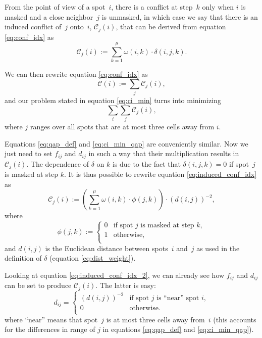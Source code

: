 \documentclass{bioinfo}
\begin{document}
From the point of view of a spot~$i$, there is a conflict at step~$k$ only when $i$ is masked and a close neighbor~$j$ is unmasked, in which case we say that there is an induced conflict of~$j$ onto~$i$, $\mathcal{C}_{j}(i)$, that can be derived from equation \ref{eq:conf_idx} as
\begin{equation}
\label{eq:induced_conf_idx}
\mathcal{C}_{j}(i) := \sum_{k=1}^{\mu} \omega(i,k) \cdot \delta(i,j,k).
\end{equation}

We can then rewrite equation \ref{eq:conf_idx} as
\begin{equation}
\mathcal{C}(i) := \sum_{j} \mathcal{C}_{j}(i),
\end{equation}
and our problem stated in equation \ref{eq:ci_min} turns into minimizing
\begin{equation}
\label{eq:ci_min_qap}
\sum_{i} \sum_{j} \mathcal{C}_{j}(i),
\end{equation}
where $j$ ranges over all spots that are at most three cells away from $i$.

Equations \ref{eq:qap_def} and \ref{eq:ci_min_qap} are conveniently similar. Now we just need to set $f_{ij}$ and $d_{ij}$ in such a way that their multiplication results in $\mathcal{C}_{j}(i)$. The dependence of $\delta$ on $k$ is due to the fact that $\delta(i,j,k) = 0$ if spot~$j$ is masked at step $k$. It is thus possible to rewrite equation \ref{eq:induced_conf_idx} as
\begin{equation}
\label{eq:induced_conf_idx_2}
\mathcal{C}_{j}(i) := \left( \sum_{k=1}^{\mu} \omega(i,k) \cdot \phi(j,k) \right) \cdot (d(i,j))^{-2},
\end{equation}
where
\begin{equation}
\phi(j,k) :=
        \left\{
                \begin{array}{ll}
                        0 & \mbox{if spot $j$ is masked at step $k$}, \\
                        1 & \mbox{otherwise}, \\
                \end{array}
        \right.
\end{equation}
and $d(i,j)$ is the Euclidean distance between spots~$i$ and~$j$ as used in the definition of $\delta$ (equation \ref{eq:dist_weight}).

Looking at equation \ref{eq:induced_conf_idx_2}, we can already see how $f_{ij}$ and $d_{ij}$ can be set to produce $\mathcal{C}_j(i)$. The latter is easy:
\begin{equation}
d_{ij} =
	\left\{
                \begin{array}{ll}
                        (d(i,j))^{-2} & \mbox{if spot $j$ is ``near'' spot $i$}, \\
                        0 & \mbox{otherwise}. \\
                \end{array}
	\right.
\end{equation}
where ``near'' means that spot~$j$ is at most three cells away from~$i$ (this accounts for the differences in range of $j$ in equations \ref{eq:qap_def} and \ref{eq:ci_min_qap}).
\end{document}

